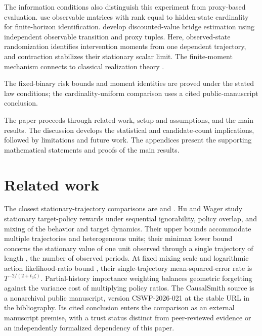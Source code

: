 \documentclass[11pt]{article}
\begin{document}
The information conditions also distinguish this experiment from proxy-based evaluation. \citet[Section 4, Assumptions 2--4, and Theorems 2--4]{NairJiang2021} use observable matrices with rank equal to hidden-state cardinality for finite-horizon identification. \citet[Section 4 and Theorems 7--8]{ShiUeharaHuangJiang2022} develop discounted-value bridge estimation using independent observable transition and proxy tuples. Here, observed-state randomization identifies intervention moments from one dependent trajectory, and contraction stabilizes their stationary scalar limit. The finite-moment mechanism connects to classical realization theory \citep[pp.\ 545--548]{Ho1966}\citep[pp.\ 26--40]{Carlyle1971}.

The fixed-binary risk bounds and moment identities are proved under the stated law conditions; the cardinality-uniform comparison uses a cited public-manuscript conclusion.

The paper proceeds through related work, setup and assumptions, and the main results. The discussion develops the statistical and candidate-count implications, followed by limitations and future work. The appendices present the supporting mathematical statements and proofs of the main results.


\section{Related work}

The closest stationary-trajectory comparisons are \citet[Theorem 2.1, Corollary 2.2, and Theorem 3.1]{HuWager2023} and \citet[Theorem 1 (Uniform overlap frontier) and the Signed-depth family definition]{CausalSmithLatentOverlap2026}. Hu and Wager study stationary target-policy rewards under sequential ignorability, policy overlap, and mixing of the behavior and target dynamics. Their upper bounds accommodate multiple trajectories and heterogeneous units; their minimax lower bound concerns the stationary value of one unit observed through a single trajectory of length , the number of observed periods. At fixed mixing scale  and logarithmic action likelihood-ratio bound , their single-trajectory mean-squared-error rate is \(T^{-2/(2+t_0\zeta)}\). Partial-history importance weighting balances geometric forgetting against the variance cost of multiplying policy ratios. The CausalSmith source is a nonarchival public manuscript, version CSWP-2026-021 at the stable URL in the bibliography. Its cited conclusion enters the comparison as an external manuscript premise, with a trust status distinct from peer-reviewed evidence or an independently formalized dependency of this paper.
\end{document}
